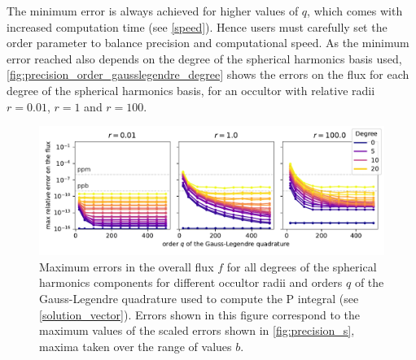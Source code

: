 \documentclass[modern]{aastex631}
\begin{document}
The minimum error is always achieved for higher values of $q$, which comes with increased computation time (see \autoref{speed}). Hence users must carefully set the order parameter to balance precision and computational speed. As the minimum error reached also depends on the degree of the spherical harmonics basis used, \autoref{fig:precision_order_gausslegendre_degree} shows the errors on the flux for each degree of the spherical harmonics basis, for an occultor with relative radii $r=0.01$, $r=1$ and $r=100$.
\begin{figure}[H]
    \begin{center}
        \includegraphics[width=\textwidth]{../workflows/precision/figures/error_order_degree.pdf}
        \caption{Maximum errors in the overall flux $f$ for all degrees of the spherical harmonics components for different occultor radii and orders $q$ of the Gauss-Legendre quadrature used to compute the P integral (see \autoref{solution_vector}). Errors shown in this figure correspond to the maximum values of the scaled errors shown in \autoref{fig:precision_s}, maxima taken over the range of values $b$.}
        \label{fig:precision_order_gausslegendre_degree}
    \end{center}
\end{figure}
\end{document}
